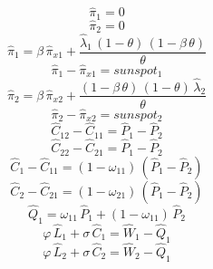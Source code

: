 \begin{dmath}
{{\hat{\pi}_{1}}}=0
\end{dmath}
\begin{dmath}
{{\hat{\pi}_{2}}}=0
\end{dmath}
\begin{dmath}
{{\hat{\pi}_{1}}}={{\beta}}\, {{\hat{\pi}_{x1}}}+\frac{{{\hat{\lambda}_{1}}}\, \left(1-{{\theta}}\right)\, \left(1-{{\beta}}\, {{\theta}}\right)}{{{\theta}}}
\end{dmath}
\begin{dmath}
{{\hat{\pi}_{1}}}-{{\hat{\pi}_{x1}}}={{sunspot_{1}}}
\end{dmath}
\begin{dmath}
{{\hat{\pi}_{2}}}={{\beta}}\, {{\hat{\pi}_{x2}}}+\frac{\left(1-{{\beta}}\, {{\theta}}\right)\, \left(1-{{\theta}}\right)\, {{\hat{\lambda}_{2}}}}{{{\theta}}}
\end{dmath}
\begin{dmath}
{{\hat{\pi}_{2}}}-{{\hat{\pi}_{x2}}}={{sunspot_{2}}}
\end{dmath}
\begin{dmath}
{{\hat{C}_{12}}}-{{\hat{C}_{11}}}={{\hat{P}_{1}}}-{{\hat{P}_{2}}}
\end{dmath}
\begin{dmath}
{{\hat{C}_{22}}}-{{\hat{C}_{21}}}={{\hat{P}_{1}}}-{{\hat{P}_{2}}}
\end{dmath}
\begin{dmath}
{{\hat{C}_{1}}}-{{\hat{C}_{11}}}=\left(1-{{\omega_{11}}}\right)\, \left({{\hat{P}_{1}}}-{{\hat{P}_{2}}}\right)
\end{dmath}
\begin{dmath}
{{\hat{C}_{2}}}-{{\hat{C}_{21}}}=\left(1-{{\omega_{21}}}\right)\, \left({{\hat{P}_{1}}}-{{\hat{P}_{2}}}\right)
\end{dmath}
\begin{dmath}
{{\hat{Q}_{1}}}={{\omega_{11}}}\, {{\hat{P}_{1}}}+\left(1-{{\omega_{11}}}\right)\, {{\hat{P}_{2}}}
\end{dmath}
\begin{dmath}
{{\varphi}}\, {{\hat{L}_{1}}}+{{\sigma}}\, {{\hat{C}_{1}}}={{\hat{W}_{1}}}-{{\hat{Q}_{1}}}
\end{dmath}
\begin{dmath}
{{\varphi}}\, {{\hat{L}_{2}}}+{{\sigma}}\, {{\hat{C}_{2}}}={{\hat{W}_{2}}}-{{\hat{Q}_{1}}}
\end{dmath}
